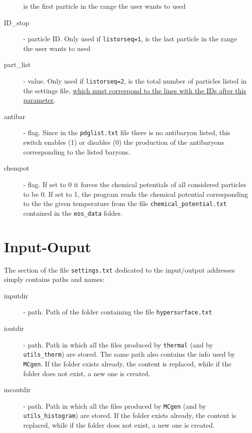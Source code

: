 \begin{description}
 is the first particle in the  range the user wants to used
 \item[ID\_stop] \integer - particle ID. Only used if {\tt listorseq=1}, 
 is the last particle in the  range the user wants to used
  \item[part\_list]  \integer - value.   Only used if {\tt listorseq=2}, is the total
  number of particles listed in the settings file, \underline{which must correspond to the lines with the IDs after this parameter}.
  \item[antibar] \integer - flag. Since in the {\tt pdglist.txt} file there is no
  antibaryon listed, this switch enables (1) or disables (0) the production of the
  antibaryons corresponding to the listed baryons.
  \item[chempot] \integer - flag. If set to 0 it forces the chemical potentials 
  of all considered particles to be 0. If set to 1, the program reads the 
  chemical potential corresponding to the the given temperature from the file 
  {\tt chemical\_potential.txt} contained in the {\tt eos\_data} folder.
  \end{description}
  
  \section{Input-Ouput}
 The section of the file {\tt settings.txt} dedicated to the input/output 
 addresses simply contains  paths and  names:
  \begin{description}
  \item[inputdir]  - path.  Path of the folder containing the 
  file {\tt hypersurface.txt}
  \item[ioutdir]  - path. Path in which all the files produced by {\tt thermal} (and by {\tt utils\_therm}) are stored. The same path also contains the info used by {\tt MCgen}. 
  If the folder exists already, the content is replaced, while if the folder does not exist, a new one is created. 
  \item[mcoutdir]  - path.    Path in which all the files produced by {\tt MCgen}  (and by {\tt utils\_histogram})   are stored. 
  If the folder exists already, the content is replaced, while if the folder does not exist, a new one is created. 
\end{description}

